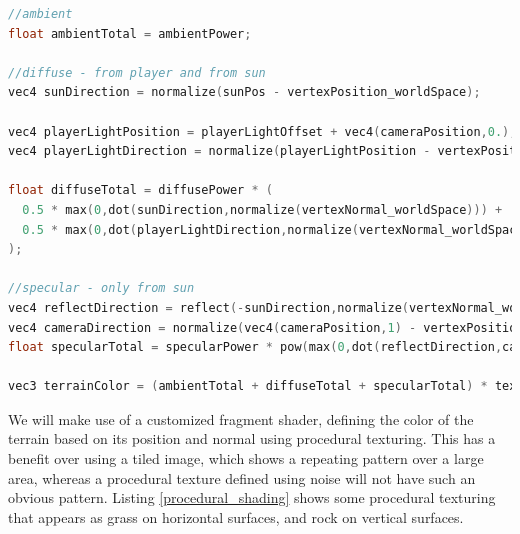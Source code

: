 \documentclass[11pt]{article}
\begin{document}
\begin{lstlisting}[language=C++,label={lighting},caption={Part of the fragment shader implementing this lighting model.}]
//ambient
float ambientTotal = ambientPower;

//diffuse - from player and from sun
vec4 sunDirection = normalize(sunPos - vertexPosition_worldSpace);

vec4 playerLightPosition = playerLightOffset + vec4(cameraPosition,0.);
vec4 playerLightDirection = normalize(playerLightPosition - vertexPosition_worldSpace);

float diffuseTotal = diffusePower * (
  0.5 * max(0,dot(sunDirection,normalize(vertexNormal_worldSpace))) +
  0.5 * max(0,dot(playerLightDirection,normalize(vertexNormal_worldSpace)))
);

//specular - only from sun
vec4 reflectDirection = reflect(-sunDirection,normalize(vertexNormal_worldSpace));
vec4 cameraDirection = normalize(vec4(cameraPosition,1) - vertexPosition_worldSpace);
float specularTotal = specularPower * pow(max(0,dot(reflectDirection,cameraDirection)),specularExponent);

vec3 terrainColor = (ambientTotal + diffuseTotal + specularTotal) * textureColor;
\end{lstlisting}
We will make use of a customized fragment shader, defining the color of the terrain based on its position and normal using procedural texturing. This has a benefit over using a tiled image, which shows a repeating pattern over a large area, whereas a procedural texture defined using noise will not have such an obvious pattern. Listing \ref{procedural_shading} shows some procedural texturing that appears as grass on horizontal surfaces, and rock on vertical surfaces.
\end{document}
